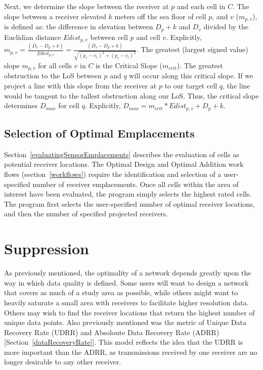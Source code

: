 Next, we determine the slope between the receiver at $p$ and each cell in $C$.  The slope between a receiver elevated $k$ meters off the sea floor of cell $p$, and $v$  ($m_{p,v}$), is defined as: the difference in elevation between $D_p + k$ and $D_v$ divided by the Euclidian distance $Edist_{p,v}$ between cell $p$ and cell $v$.  Explicitly, $m_{p,v} = \frac{(D_v - D_p + k)}{Edist_{p,v}} = \frac{(D_v - D_p + k)}{\sqrt{(p_r - v_r )^2 + (p_c - v_c)^2}}$.  The greatest (largest signed value) slope $m_{p,v}$ for all cells $v$ in $C$ is the Critical Slope ($m_{crit}$).  The greatest obstruction to the LoS between $p$ and $q$ will occur along this critical slope.  If we project a line with this slope from the receiver at $p$ to our target cell $q$, the line would be tangent to the tallest obstruction along our LoS.  Thus, the critical slope determines $D_{max}$ for cell $q$.  Explicitly, $D_{max} = m_{crit} * Edist_{p,v} + D_p + k$.


\subsection{Selection of Optimal Emplacements}
\label{selectionOfOptimalEmplacements}
Section~\ref{evaluatingSensorEmplacements} describes the evaluation of cells as potential receiver locations.  The Optimal Design and Optimal Addition work flows (section~\ref{workflows}) require the identification and selection of a user-specified number of receiver emplacements.  Once all cells within the area of interest have been evaluated, the program simply selects the highest rated cells.  The program first selects the user-specified number of optimal receiver locations, and then the number of specified projected receivers.


\section{Suppression}
\label{suppression}
As previously mentioned, the optimality of a network depends greatly upon the way in which data quality is defined.  Some users will want to design a network that covers as much of a study area as possible, while others might want to heavily saturate a small area with receivers to facilitate higher resolution data.  Others may wish to find the receiver locations that return the highest number of unique data points.  Also previously mentioned was the metric of Unique Data Recovery Rate (UDRR) and Absoloute Data Recovery Rate (ADRR) [Section~\ref{dataRecoveryRate}].  This model reflects the idea that the UDRR is more important than the ADRR, as transmissions received by one receiver are no longer desirable to any other receiver.

